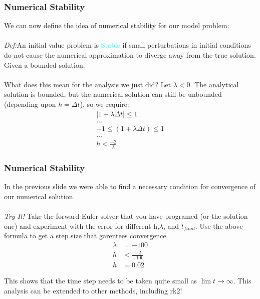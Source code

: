 \documentclass{beamer}
\begin{document}
\begin{frame}
\frametitle{Numerical Stability}

We can now define the idea of numerical stability for our model problem: \\
\ \\
\textit{Def:}An initial value problem is \textcolor{cyan}{Stable} if small perturbations in initial conditions do not cause the numerical approximation to diverge away from the true solution. Given a bounded solution.\\
\ \\
What does this mean for the analysis we just did? Let $\lambda < 0 $. The analytical solution is bounded, but the numerical solution can still be unbounded (depending upon $h=\Delta t$), so we require: 
\begin{align*}
|1+\lambda\Delta t| \leq 1\\
\hdots\\
-1\leq (1+\lambda\Delta t) \leq 1\\
\hdots\\
h<\frac{-2}{\lambda}
\end{align*}

\end{frame}
\begin{frame}
\frametitle{Numerical Stability}

In the previous slide we were able to find a necessary condition for convergence of our numerical solution. \\
\ \\
\textit{Try It!} Take the forward Euler solver that you have programed (or the solution one) and experiment with the error for different h,$\lambda$, and $t_{final}$. Use the above formula to get a step size that garentees convergence.
\begin{align*} 
\lambda &= -100\\
h &< \frac{-2}{-100}\\
h &= 0.02
\end{align*}

This shows that the time step needs to be taken quite small as $\lim t \rightarrow \infty$. This analysis can be extended to other methods, including rk2!
\end{frame}
\end{document}

